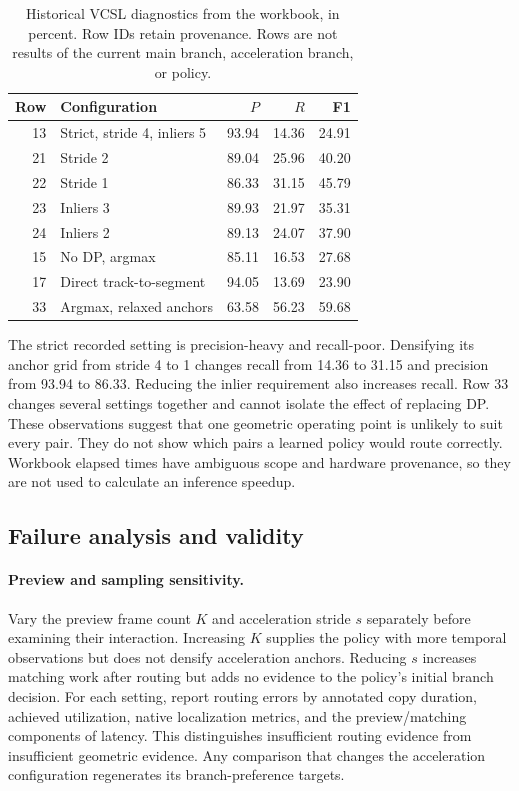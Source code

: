 \begin{table}[t]
\centering\footnotesize
\setlength{\tabcolsep}{4pt}
\caption{Historical VCSL diagnostics from the workbook, in percent. Row IDs retain provenance.
Rows are not results of the current main branch, acceleration branch, or policy.}
\label{tab:history}
\begin{tabular}{@{}rlrrr@{}}
\toprule
Row & Configuration & $P$ & $R$ & F1\\
\midrule
13 & Strict, stride 4, inliers 5 & 93.94 & 14.36 & 24.91\\
21 & Stride 2 & 89.04 & 25.96 & 40.20\\
22 & Stride 1 & 86.33 & 31.15 & 45.79\\
23 & Inliers 3 & 89.93 & 21.97 & 35.31\\
24 & Inliers 2 & 89.13 & 24.07 & 37.90\\
15 & No DP, argmax & 85.11 & 16.53 & 27.68\\
17 & Direct track-to-segment & 94.05 & 13.69 & 23.90\\
33 & Argmax, relaxed anchors & 63.58 & 56.23 & 59.68\\
\bottomrule
\end{tabular}
\end{table}

The strict recorded setting is precision-heavy and recall-poor. Densifying its anchor grid
from stride 4 to 1 changes recall from 14.36 to 31.15 and precision from 93.94 to 86.33.
Reducing the inlier requirement also increases recall. Row 33 changes several settings
together and cannot isolate the effect of replacing DP. These observations suggest that
one geometric operating point is unlikely to suit every pair. They do not show which pairs
a learned policy would route correctly. Workbook elapsed times have ambiguous scope and
hardware provenance, so they are not used to calculate an inference speedup.

\subsection{Failure analysis and validity}
\paragraph{Preview and sampling sensitivity.}
Vary the preview frame count $K$ and acceleration stride $s$ separately before examining
their interaction. Increasing $K$ supplies the policy with more temporal observations but
does not densify acceleration anchors. Reducing $s$ increases matching work after routing
but adds no evidence to the policy's initial branch decision. For each
setting, report routing errors by annotated copy duration, achieved utilization, native
localization metrics, and the preview/matching components of latency. This distinguishes
insufficient routing evidence from insufficient geometric evidence. Any comparison that
changes the acceleration configuration regenerates its branch-preference targets.

